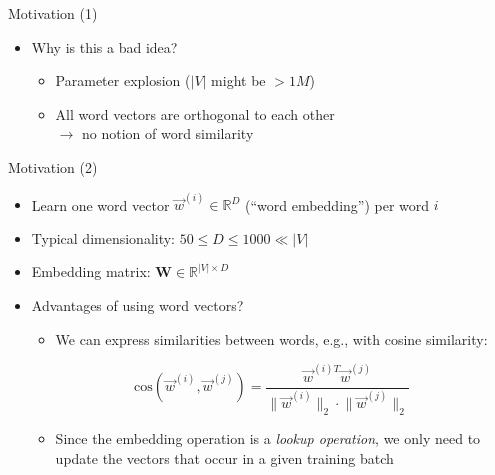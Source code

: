 \begin{vbframe}{Motivation (1)}
\begin{itemize}
	\item \ques Why is this a bad idea?
		\begin{itemize}
			\item Parameter explosion ($|V|$ might be $> 1M$)
			\item All word vectors are orthogonal to each other\\$\rightarrow$ no notion of word similarity
		\end{itemize}
\end{itemize}

\vfill

\end{vbframe}


\begin{frame}{Motivation (2)}

\vfill

\begin{itemize}
	\item Learn one word vector $\vec w^{(i)} \in \mathbb{R}^{D}$ (``word embedding'') per word $i$
	\item Typical dimensionality: $50 \leq D \leq 1000 \ll |V|$
	\item Embedding matrix: $\mathbf{W} \in \mathbb{R}^{|V|\times D}$
	\item \ques Advantages of using word vectors?
	\pause
		\begin{itemize}
			\item We can express similarities between words, e.g., with cosine similarity:
		\end{itemize}
		 $$\mathrm{cos}(\vec w^{(i)}, \vec w^{(j)}) = \frac{\vec w^{(i)T}\vec w^{(j)}}{\lVert \vec w^{(i)} \rVert_2 \cdot \lVert \vec w^{(j)}\lVert_2}$$
		\begin{itemize}
			\item Since the embedding operation is a \emph{lookup operation}, we only need to update the vectors that occur in a given training batch
		\end{itemize}
\end{itemize}

\vfill

\end{frame}


